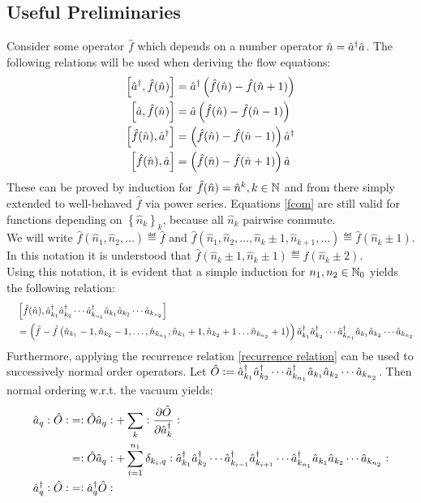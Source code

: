 \subsection{Useful Preliminaries}
Consider some operator $\hat f$ which depends on a number operator $\hat n=\hat a^\dagger\hat a$. The following relations will be used when deriving the flow equations:
\begin{subequations}
\label{fcom}
\begin{align}
\left[\hat a^\dagger,\hat f(\hat n) \right] &= \hat a^\dagger\left(\hat f(\hat n)-\hat f(\hat n+1)\right)\\ 
\left[\hat a,\hat f(\hat n) \right] &= \hat a\left(\hat f(\hat n)-\hat f(\hat n-1)\right)\\
\left[\hat f(\hat n),\hat a^\dagger \right] &= \left(\hat f(\hat n)-\hat f(\hat n-1)\right)\hat a^\dagger\\
\left[\hat f(\hat n),\hat a \right] &= \left(\hat f(\hat n)-\hat f(\hat n+1)\right)\hat a
\end{align}
\end{subequations}
These can be proved by induction for $\hat f(\hat n)=\hat n^k, k\in\mathbb{N}$ and from there simply extended to well-behaved $\hat f$ via power series. Equations \ref{fcom} are still valid for functions depending on $\left\{\hat n_k\right\}_k$, because all $\hat n_k$ pairwise commute.\\
We will write $\hat f\left(\hat n_1,\hat n_2,\hdots\right)\eqdef \hat f$ and $\hat f\left(\hat n_1,\hat n_2,\hdots,\hat n_k\pm 1,\hat n_{k+1},\hdots\right)\eqdef \hat f(\hat n_k\pm1)$. In this notation it is understood that $\hat f(\hat n_k\pm1,\hat n_{k}\pm1)\eqdef\hat f(\hat n_k\pm2)$.\\
Using this notation, it is evident that a simple induction for $n_1,n_2\in\mathbb{N}_0$ yields the following relation:
\begin{align}
&\left[\hat f(\hat n),\hat a^\dagger_{k_1}\hat a^\dagger_{k_2}\cdots\hat a^\dagger_{k_{n_1}}\hat a_{k_1}\hat a_{k_2}\cdots\hat a_{k_{n_2}} \right] \nonumber \\ \quad& 
= \left(\hat f-\hat f\left(\hat n_{k_1}-1,\hat n_{k_2}-1,\hdots,\hat n_{k_{n_1}},\hat n_{k_1}+1,\hat n_{k_2}+1\hdots\hat n_{k_{n_2}}+1\right)\right)\hat a^\dagger_{k_1}\hat a^\dagger_{k_2}\cdots\hat a^\dagger_{k_{n_1}}\hat a_{k_1}\hat a_{k_2}\cdots\hat a_{k_{n_2}}
\end{align}
Furthermore, applying the recurrence relation \ref{recurrence relation} can be used to successively normal order operators. Let $\hat O\vcentcolon= \hat a^\dagger_{k_1}\hat a^\dagger_{k_2}\cdots\hat a^\dagger_{k_{n_1}}\hat a_{k_1}\hat a_{k_2}\cdots\hat a_{k_{n_2}}$. Then normal ordering w.r.t. the vacuum yields:
\begin{subequations}
\begin{align}
\hat a_q\vcentcolon\hat O\vcentcolon &=\vcentcolon\hat O\hat a_q\vcentcolon + \sum\limits_{k}\vcentcolon \frac{\partial \hat O}{\partial\hat a^\dagger_k}\vcentcolon \nonumber \\
 &= \vcentcolon\hat O\hat a_q\vcentcolon + \sum\limits_{i=1}^{n_1}\delta_{k_i,q}\vcentcolon \hat a^\dagger_{k_1}\hat a^\dagger_{k_2}\cdots\hat a^\dagger_{k_{i-1}}\hat a^\dagger_{k_{i+1}}\cdots\hat a^\dagger_{k_{n_1}}\hat a_{k_1}\hat a_{k_2}\cdots\hat a_{k_{n_2}}\vcentcolon \\
\hat a^\dagger_q\vcentcolon\hat O\vcentcolon &= \vcentcolon \hat a^\dagger_q\hat O\vcentcolon
\end{align}
\end{subequations}
